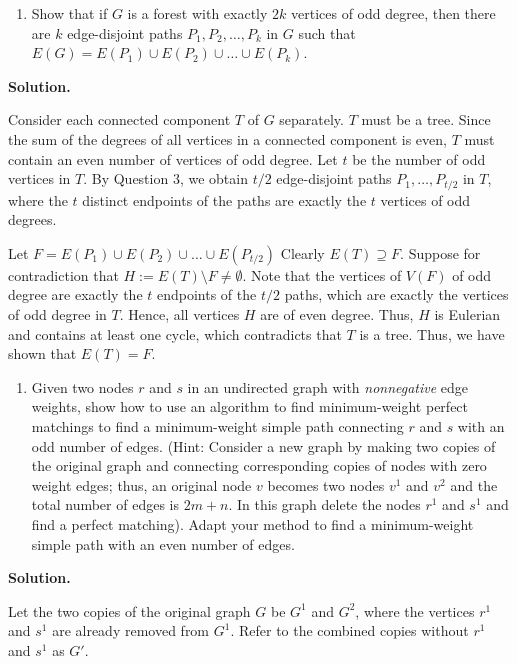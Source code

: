 \documentclass[11pt,letterpaper]{article}
\theoremstyle{definition}
\newcommand{\solution}{\medskip\noindent\textbf{Solution.}\par\medskip}
\begin{document}
\begin{enumerate}[resume=q]
\item Show that if $G$ is a forest with exactly $2k$ vertices of odd degree, then there are $k$ edge-disjoint paths $P_1, P_2, \ldots, P_k$ in $G$ such that $E(G) = E(P_1) \cup E(P_2) \cup \ldots \cup E(P_k)$.
\end{enumerate}

\solution
Consider each connected component $T$ of $G$ separately. 
$T$ must be a tree. 
Since the sum of the degrees of all vertices in a connected component is even, $T$ must contain an even number of vertices of odd degree.
Let $t$ be the number of odd vertices in $T$.
By Question 3, we obtain $t/2$ edge-disjoint paths $P_1,\dots, P_{t/2}$ in $T$, where the $t$ distinct endpoints of the paths are exactly the $t$ vertices of odd degrees.

Let $F = E(P_1) \cup E(P_2) \cup \ldots \cup E(P_{t/2})$
Clearly $E(T) \supseteq F$.
Suppose for contradiction that $H := E(T)\setminus F\neq \emptyset$. 
Note that the vertices of $V(F)$ of odd degree are exactly the $t$ endpoints of the $t/2$ paths, which are exactly the vertices of odd degree in $T$.
Hence, all vertices $H$ are of even degree. 
Thus, $H$ is Eulerian and contains at least one cycle, which contradicts that $T$ is a tree.
Thus, we have shown that $E(T) = F$.


\begin{enumerate}[resume=q]
\item Given two nodes $r$ and $s$ in an undirected graph with \emph{nonnegative} edge weights, show how to use an algorithm to find minimum-weight perfect matchings to find a minimum-weight simple path connecting $r$ and $s$ with an odd number of edges. (Hint: Consider a new graph by making two copies of the original graph and connecting corresponding copies of nodes with zero weight edges; thus, an original node $v$ becomes two nodes $v^1$ and $v^2$ and the total number of edges is $2m+n$. In this graph delete the nodes $r^1$ and $s^1$ and find a perfect matching). Adapt your method to find a minimum-weight simple path with an even number of edges.
\end{enumerate}

\solution
Let the two copies of the original graph $G$ be $G^1$ and $G^2$, where the vertices $r^1$ and $s^1$ are already removed from $G^1$.
Refer to the combined copies without $r^1$ and $s^1$ as $G'$.
\end{document}
